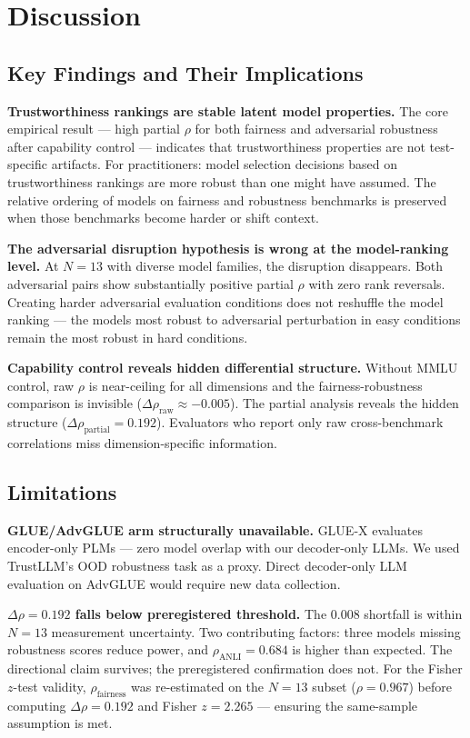 \section{Discussion}
\label{sec:discussion}

\subsection{Key Findings and Their Implications}

\textbf{Trustworthiness rankings are stable latent model properties.} The core empirical result --- high partial $\rho$ for both fairness and adversarial robustness after capability control --- indicates that trustworthiness properties are not test-specific artifacts. For practitioners: model selection decisions based on trustworthiness rankings are more robust than one might have assumed. The relative ordering of models on fairness and robustness benchmarks is preserved when those benchmarks become harder or shift context.

\textbf{The adversarial disruption hypothesis is wrong at the model-ranking level.} At $N=13$ with diverse model families, the disruption disappears. Both adversarial pairs show substantially positive partial $\rho$ with zero rank reversals. Creating harder adversarial evaluation conditions does not reshuffle the model ranking --- the models most robust to adversarial perturbation in easy conditions remain the most robust in hard conditions.

\textbf{Capability control reveals hidden differential structure.} Without MMLU control, raw $\rho$ is near-ceiling for all dimensions and the fairness-robustness comparison is invisible ($\Delta\rho_{\text{raw}} \approx -0.005$). The partial analysis reveals the hidden structure ($\Delta\rho_{\text{partial}} = 0.192$). Evaluators who report only raw cross-benchmark correlations miss dimension-specific information.

\subsection{Limitations}

\textbf{GLUE/AdvGLUE arm structurally unavailable.} GLUE-X \citep{Yang2023GLUEX} evaluates encoder-only PLMs --- zero model overlap with our decoder-only LLMs. We used TrustLLM's OOD robustness task as a proxy. Direct decoder-only LLM evaluation on AdvGLUE would require new data collection.

\textbf{$\Delta\rho = 0.192$ falls below preregistered threshold.} The 0.008 shortfall is within $N=13$ measurement uncertainty. Two contributing factors: three models missing robustness scores reduce power, and $\rho_{\text{ANLI}} = 0.684$ is higher than expected. The directional claim survives; the preregistered confirmation does not. For the Fisher $z$-test validity, $\rho_{\text{fairness}}$ was re-estimated on the $N=13$ subset ($\rho=0.967$) before computing $\Delta\rho=0.192$ and Fisher $z=2.265$ --- ensuring the \citet{Meng1992Comparing} same-sample assumption is met.

